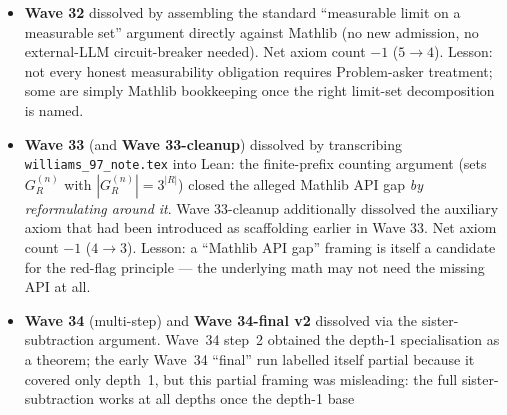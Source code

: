 \documentclass[11pt,a4paper]{article}
\theoremstyle{plain}
\theoremstyle{definition}
\begin{document}
\begin{itemize}[leftmargin=1.5em]
       via a
      one-page $\varepsilon/\delta$ argument routed through the
      Problem-asker (\S\ref{sec:problem-asker}). The admission
      previously read ``parametric DCT in disguise / single-point
      cylinder concentration'', which had been treated as a Mathlib
      API gap; the external-LLM proof reorganised the integral split
      $\int_{\partial T} = \int_{I(\varphi,p)} + \int_{\partial T \setminus I(\varphi,p)}$
      and bounded each piece using only (F1) cylinder concentration,
      (F2) Poisson representation, and (F3) uniform continuity ---
      all already available in the project. Net axiom count $-1$.
      Lesson: when an admission is ``DCT/Portmanteau in disguise'',
      the disguise is usually an $\varepsilon/\delta$ proof that
      uses only the stated facts.
\item \textbf{Wave 32} dissolved  by
      assembling the standard ``measurable limit on a measurable
      set'' argument directly against Mathlib (no new admission, no
      external-LLM circuit-breaker needed). Net axiom count $-1$
      ($5 \to 4$). Lesson: not every honest measurability obligation
      requires Problem-asker treatment; some are simply Mathlib
      bookkeeping once the right limit-set decomposition is named.
\item \textbf{Wave 33} (and \textbf{Wave 33-cleanup}) dissolved
       by
      transcribing \texttt{williams\_97\_note.tex} into Lean: the
      finite-prefix counting argument (sets $G_R^{(n)}$ with
      $|G_R^{(n)}| = 3^{|R|}$) closed the alleged Mathlib API gap
      \emph{by reformulating around it}. Wave 33-cleanup additionally
      dissolved the auxiliary 
      axiom that had been introduced as scaffolding earlier in
      Wave 33. Net axiom count $-1$ ($4 \to 3$). Lesson: a
      ``Mathlib API gap'' framing is itself a candidate for the
      red-flag principle --- the underlying math may not need the
      missing API at all.
\item \textbf{Wave 34} (multi-step) and \textbf{Wave 34-final v2}
      dissolved 
      via the sister-subtraction argument. Wave~34 step~2 obtained
      the depth-1 specialisation as a theorem; the early Wave~34
      ``final'' run labelled itself partial because it covered only
      depth~1, but this partial framing was misleading: the full
      sister-subtraction works at all depths once the depth-1 base

\end{itemize}
\end{document}
